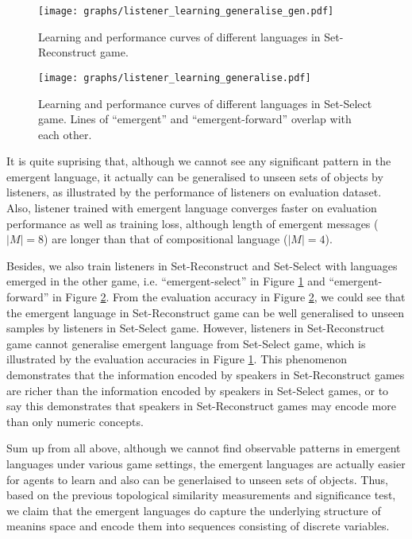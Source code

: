 \begin{figure}[!h]
    \centering
    \texttt{[image: graphs/listener\_learning\_generalise\_gen.pdf]}
    \caption{Learning and performance curves of different languages in Set-Reconstruct game.}
    \label{fig4.0:listener_learning_generalise_gen}
\end{figure}

\begin{figure}[!h]
    \centering
    \texttt{[image: graphs/listener\_learning\_generalise.pdf]}
    \caption{Learning and performance curves of different languages in Set-Select game. Lines of ``emergent'' and ``emergent-forward'' overlap with each other.}
    \label{fig4.00:listener_learning_generalise_ref}
\end{figure}

It is quite suprising that, although we cannot see any significant pattern in the emergent language, it actually can be generalised to unseen sets of objects by listeners, as illustrated by the performance of listeners on evaluation dataset. Also, listener trained with emergent language converges faster on evaluation performance as well as training loss, although length of emergent messages ($|M|=8$) are longer than that of compositional language ($|M|=4$).

Besides, we also train listeners in Set-Reconstruct and Set-Select with languages emerged in the other game, i.e. ``emergent-select'' in Figure \ref{fig4.0:listener_learning_generalise_gen} and ``emergent-forward'' in Figure \ref{fig4.00:listener_learning_generalise_ref}. From the evaluation accuracy in Figure \ref{fig4.00:listener_learning_generalise_ref}, we could see that the emergent language in Set-Reconstruct game can be well generalised to unseen samples by listeners in Set-Select game. However, listeners in Set-Reconstruct game cannot generalise emergent language from Set-Select game, which is illustrated by the evaluation accuracies in Figure \ref{fig4.0:listener_learning_generalise_gen}. This phenomenon demonstrates that the information encoded by speakers in Set-Reconstruct games are richer than the information encoded by speakers in Set-Select games, or to say this demonstrates that speakers in Set-Reconstruct games may encode more than only numeric concepts.

Sum up from all above, although we cannot find observable patterns in emergent languages under various game settings, the emergent languages are actually easier for agents to learn and also can be generlaised to unseen sets of objects. Thus, based on the previous topological similarity measurements and significance test, we claim that the emergent languages do capture the underlying structure of meanins space and encode them into sequences consisting of discrete variables.

